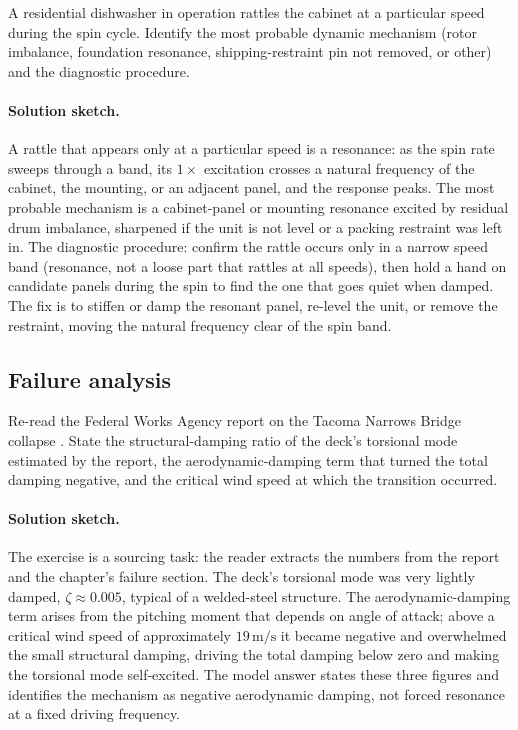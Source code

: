 \begin{exercise}
A residential dishwasher in operation rattles the cabinet at a
particular speed during the spin cycle. Identify the most probable
dynamic mechanism (rotor imbalance, foundation resonance,
shipping-restraint pin not removed, or other) and the diagnostic
procedure.

\paragraph{Solution sketch.} A rattle that appears only at a
particular speed is a resonance: as the spin rate sweeps through a
band, its $1\times$ excitation crosses a natural frequency of the
cabinet, the mounting, or an adjacent panel, and the response peaks.
The most probable mechanism is a cabinet-panel or mounting resonance
excited by residual drum imbalance, sharpened if the unit is not level
or a packing restraint was left in. The diagnostic procedure: confirm
the rattle occurs only in a narrow speed band (resonance, not a loose
part that rattles at all speeds), then hold a hand on candidate panels
during the spin to find the one that goes quiet when damped. The fix
is to stiffen or damp the resonant panel, re-level the unit, or remove
the restraint, moving the natural frequency clear of the spin band.
\end{exercise}

\subsection*{Failure analysis}

\begin{exercise}
Re-read the Federal Works Agency report on the Tacoma Narrows
Bridge collapse \cite{acc:tacoma-narrows-1941}. State the
structural-damping ratio of the deck's torsional mode estimated by
the report, the aerodynamic-damping term that turned the total
damping negative, and the critical wind speed at which the
transition occurred.

\paragraph{Solution sketch.} The exercise is a sourcing task: the
reader extracts the numbers from the report and the chapter's failure
section. The deck's torsional mode was very lightly damped,
$\zeta \approx 0.005$, typical of a welded-steel structure. The
aerodynamic-damping term arises from the pitching moment that depends
on angle of attack; above a critical wind speed of approximately
$19\,\si{\meter\per\second}$ it became negative and overwhelmed the
small structural damping, driving the total damping below zero and
making the torsional mode self-excited. The model answer states these
three figures and identifies the mechanism as negative aerodynamic
damping, not forced resonance at a fixed driving frequency.
\end{exercise}

